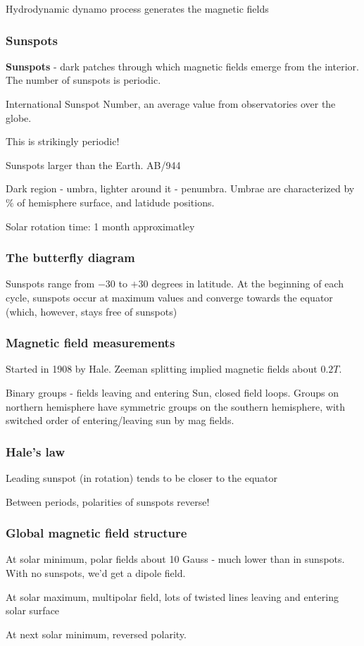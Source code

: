 \documentclass[PlasmaNotes.tex]{subfiles}
\begin{document}
Hydrodynamic dynamo process generates the magnetic fields

\subsubsection{Sunspots}

\textbf{Sunspots} - dark patches through which magnetic fields emerge from the interior. The number of sunspots is periodic.

International Sunspot Number, an average value from observatories over the globe.

This is strikingly periodic!

Sunspots larger than the Earth. AB/944

Dark region - umbra, lighter around it - penumbra. Umbrae are characterized by $\%$ of hemisphere surface, and latidude positions.

Solar rotation time: 1 month approximatley

\subsubsection{The butterfly diagram}

Sunspots range from $-30$ to $+30$ degrees in latitude. At the beginning of each cycle, sunspots occur at maximum values and converge towards the equator (which, however, stays free of sunspots)

\subsubsection{Magnetic field measurements}

Started in 1908 by Hale. Zeeman splitting implied magnetic fields about $ 0.2 T$.

Binary groups - fields leaving and entering Sun, closed field loops. Groups on northern hemisphere have symmetric groups on the southern hemisphere, with switched order of entering/leaving sun by mag fields.

\subsubsection{Hale's law}

Leading sunspot (in rotation) tends to be closer to the equator

Between periods, polarities of sunspots reverse!

\subsubsection{Global magnetic field structure}

At solar minimum, polar fields about 10 Gauss - much lower than in sunspots. With no sunspots, we'd get a dipole field. 

At solar maximum, multipolar field, lots of twisted lines leaving and entering solar surface

At next solar minimum, reversed polarity.
\end{document}
